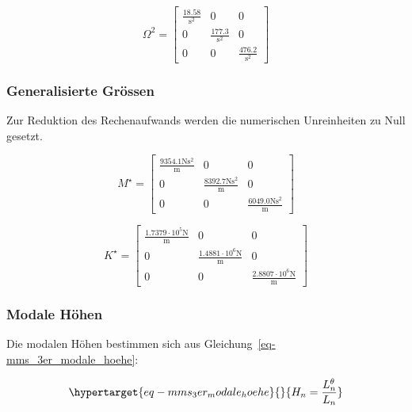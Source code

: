 \documentclass[
  letterpaper,
  DIV=11]{scrreprt}
\begin{document}
\begin{equation}\Omega^{2} = \left[\begin{matrix}\frac{18.58}{\text{s}^{2}} & 0 & 0\\0 & \frac{177.3}{\text{s}^{2}} & 0\\0 & 0 & \frac{476.2}{\text{s}^{2}}\end{matrix}\right]\end{equation}

\hypertarget{generalisierte-gruxf6ssen-1}{%
\subsubsection{Generalisierte
Grössen}\label{generalisierte-gruxf6ssen-1}}

Zur Reduktion des Rechenaufwands werden die numerischen Unreinheiten zu
Null gesetzt.

\begin{equation}M^{\star} = \left[\begin{matrix}\frac{9354.1 \text{N} \text{s}^{2}}{\text{m}} & 0 & 0\\0 & \frac{8392.7 \text{N} \text{s}^{2}}{\text{m}} & 0\\0 & 0 & \frac{6049.0 \text{N} \text{s}^{2}}{\text{m}}\end{matrix}\right]\end{equation}

\begin{equation}K^{\star} = \left[\begin{matrix}\frac{1.7379 \cdot 10^{5} \text{N}}{\text{m}} & 0 & 0\\0 & \frac{1.4881 \cdot 10^{6} \text{N}}{\text{m}} & 0\\0 & 0 & \frac{2.8807 \cdot 10^{6} \text{N}}{\text{m}}\end{matrix}\right]\end{equation}

\hypertarget{modale-huxf6hen}{%
\subsubsection{Modale Höhen}\label{modale-huxf6hen}}

Die modalen Höhen bestimmen sich aus
Gleichung~\ref{eq-mms_3er_modale_hoehe}:

\begin{equation}\protect\hypertarget{eq-mms_3er_modale_hoehe}{}{
H_n = \frac{L_n^\theta}{L_n}
}\label{eq-mms_3er_modale_hoehe}\end{equation}
\end{document}
